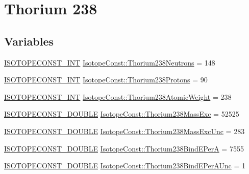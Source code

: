 \hypertarget{group___isotope_const-_thorium-_th238}{}\section{Thorium 238}
\label{group___isotope_const-_thorium-_th238}
\subsection*{Variables}
\begin{DoxyCompactItemize}
\item 
\mbox{\hyperlink{group___isotope_const-_macros_ga5f18360b3e99483a35c32d789e62621c}{I\+S\+O\+T\+O\+P\+E\+C\+O\+N\+S\+T\+\_\+\+I\+NT}} \mbox{\hyperlink{group___isotope_const-_thorium-_th238_gac576c65ce14e1b4c9653b7f9c7907502}{Isotope\+Const\+::\+Thorium238\+Neutrons}} = 148
\item 
\mbox{\hyperlink{group___isotope_const-_macros_ga5f18360b3e99483a35c32d789e62621c}{I\+S\+O\+T\+O\+P\+E\+C\+O\+N\+S\+T\+\_\+\+I\+NT}} \mbox{\hyperlink{group___isotope_const-_thorium-_th238_gaaddeca81c879c6eeee7344032a5b90b5}{Isotope\+Const\+::\+Thorium238\+Protons}} = 90
\item 
\mbox{\hyperlink{group___isotope_const-_macros_ga5f18360b3e99483a35c32d789e62621c}{I\+S\+O\+T\+O\+P\+E\+C\+O\+N\+S\+T\+\_\+\+I\+NT}} \mbox{\hyperlink{group___isotope_const-_thorium-_th238_ga0a6ff501b1d944fcac3df7e6ccbe2438}{Isotope\+Const\+::\+Thorium238\+Atomic\+Weight}} = 238
\item 
\mbox{\hyperlink{group___isotope_const-_macros_ga8f45a7272ce02c0b4c65c44636ed719a}{I\+S\+O\+T\+O\+P\+E\+C\+O\+N\+S\+T\+\_\+\+D\+O\+U\+B\+LE}} \mbox{\hyperlink{group___isotope_const-_thorium-_th238_gac78fecc1572be6c16b3942db8cfff186}{Isotope\+Const\+::\+Thorium238\+Mass\+Exc}} = 52525
\item 
\mbox{\hyperlink{group___isotope_const-_macros_ga8f45a7272ce02c0b4c65c44636ed719a}{I\+S\+O\+T\+O\+P\+E\+C\+O\+N\+S\+T\+\_\+\+D\+O\+U\+B\+LE}} \mbox{\hyperlink{group___isotope_const-_thorium-_th238_ga75f6af3b5ffeb62fca3881097d95232b}{Isotope\+Const\+::\+Thorium238\+Mass\+Exc\+Unc}} = 283
\item 
\mbox{\hyperlink{group___isotope_const-_macros_ga8f45a7272ce02c0b4c65c44636ed719a}{I\+S\+O\+T\+O\+P\+E\+C\+O\+N\+S\+T\+\_\+\+D\+O\+U\+B\+LE}} \mbox{\hyperlink{group___isotope_const-_thorium-_th238_ga814c008b2dca538e3638b33a39bab72d}{Isotope\+Const\+::\+Thorium238\+Bind\+E\+PerA}} = 7555
\item 
\mbox{\hyperlink{group___isotope_const-_macros_ga8f45a7272ce02c0b4c65c44636ed719a}{I\+S\+O\+T\+O\+P\+E\+C\+O\+N\+S\+T\+\_\+\+D\+O\+U\+B\+LE}} \mbox{\hyperlink{group___isotope_const-_thorium-_th238_ga59ccabcb844c440cea1f4e80b2bd96d4}{Isotope\+Const\+::\+Thorium238\+Bind\+E\+Per\+A\+Unc}} = 1

\end{DoxyCompactItemize}
